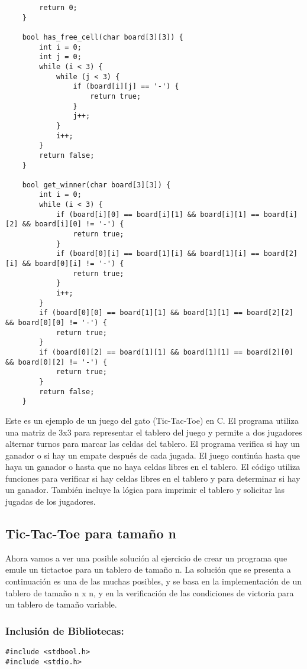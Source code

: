 \begin{verbatim}
        return 0;
    }
    
    bool has_free_cell(char board[3][3]) {
        int i = 0;
        int j = 0;
        while (i < 3) {
            while (j < 3) {
                if (board[i][j] == '-') {
                    return true;
                }
                j++;
            }
            i++;
        }
        return false;
    }
    
    bool get_winner(char board[3][3]) {
        int i = 0;
        while (i < 3) {
            if (board[i][0] == board[i][1] && board[i][1] == board[i][2] && board[i][0] != '-') {
                return true;
            }
            if (board[0][i] == board[1][i] && board[1][i] == board[2][i] && board[0][i] != '-') {
                return true;
            }
            i++;
        }
        if (board[0][0] == board[1][1] && board[1][1] == board[2][2] && board[0][0] != '-') {
            return true;
        }
        if (board[0][2] == board[1][1] && board[1][1] == board[2][0] && board[0][2] != '-') {
            return true;
        }
        return false;
    }    
\end{verbatim}

Este es un ejemplo de un juego del gato (Tic-Tac-Toe) en C. El programa utiliza una matriz de 3x3 para representar el tablero del juego y permite a dos jugadores alternar turnos para marcar las celdas del tablero. El programa verifica si hay un ganador o si hay un empate después de cada jugada. El juego continúa hasta que haya un ganador o hasta que no haya celdas libres en el tablero. El código utiliza funciones para verificar si hay celdas libres en el tablero y para determinar si hay un ganador. También incluye la lógica para imprimir el tablero y solicitar las jugadas de los jugadores.

\newpage
\subsection{Tic-Tac-Toe para tamaño n}
Ahora vamos a ver una posible solución al ejercicio de crear un programa que emule un tictactoe para un tablero de tamaño n. La solución que se presenta a continuación es una de las muchas posibles, y se basa en la implementación de un tablero de tamaño n x n, y en la verificación de las condiciones de victoria para un tablero de tamaño variable.

\subsubsection{Inclusión de Bibliotecas:}
\begin{verbatim}
#include <stdbool.h>
#include <stdio.h>
\end{verbatim}

